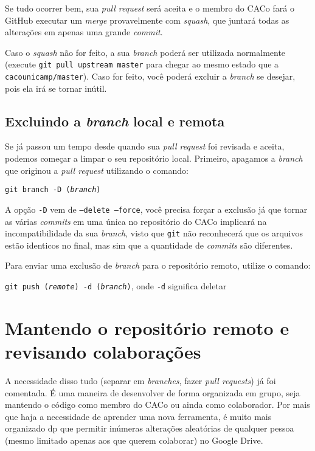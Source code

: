 \documentclass[a4paper,oneside,10pt]{memoir}
\begin{document}
Se tudo ocorrer bem, sua \emph{pull request} será aceita e o membro do CACo fará
o GitHub executar um \emph{merge} provavelmente com \emph{squash}, que juntará
todas as alterações em apenas uma grande \emph{commit}.

Caso o \emph{squash} não for feito, a sua \emph{branch} poderá ser utilizada
normalmente (execute \texttt{git pull upstream master} para chegar ao mesmo
estado que a \texttt{ca\-co\-unicamp/master}). Caso for feito, você poderá excluir a
\emph{branch} se desejar, pois ela irá se tornar inútil.

\section{Excluindo a \emph{branch} local e remota}

Se já passou um tempo desde quando sua \emph{pull request} foi revisada e
aceita, podemos começar a limpar o seu repositório local. Primeiro, apagamos a
\emph{branch} que originou a \emph{pull request} utilizando o comando:

\begin{center}
\texttt{git branch -D (\emph{branch})}
\end{center}

A opção \texttt{-D} vem de \texttt{--delete --force}, você
precisa forçar a exclusão já que tornar as várias \emph{commits} em uma única
no repositório do CACo implicará na incompatibilidade da sua \emph{branch},
visto que \texttt{git} não reconhecerá que os arquivos estão identicos no
final, mas sim que a quantidade de \emph{commits} são diferentes.

Para enviar uma exclusão de \emph{branch} para o repositório remoto, utilize o
comando:

\begin{center}
\texttt{git push (\emph{remote}) -d (\emph{branch})}, onde \texttt{-d} significa
deletar
\end{center}


\chapter{Mantendo o repositório remoto e revisando colaborações}

A necessidade disso tudo (separar em \emph{branches}, fazer \emph{pull
requests}) já foi comentada. É uma maneira de desenvolver de forma organizada em
grupo, seja mantendo o código como membro do CACo ou ainda como colaborador. Por
mais que haja a necessidade de aprender uma nova ferramenta, é muito mais
organizado dp que permitir inúmeras alterações aleatórias de qualquer pessoa
(mesmo limitado apenas aos que querem colaborar) no Google Drive.
\end{document}
